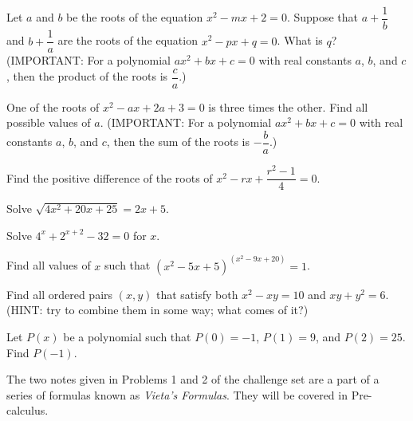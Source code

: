 \documentclass[../book.tex]{subfiles}
\begin{document}
\begin{challengeset}
\item Let $a$ and $b$ be the roots of the equation $x^2-mx+2=0$.  Suppose that $a+\dfrac{1}{b}$ and $b+\dfrac{1}{a}$ are the roots of the equation $x^2-px+q=0$.  What is $q$? (IMPORTANT: For a polynomial $ax^2+bx+c=0$ with real constants $a$, $b$, and $c$, then the product of the roots is $\dfrac{c}{a}$.) \vspace{2mm}
\item One of the roots of $x^2-ax+2a+3=0$ is three times the other.  Find all possible values of $a$.  (IMPORTANT: For a polynomial $ax^2+bx+c=0$ with real constants $a$, $b$, and $c$, then the sum of the roots is $-\dfrac{b}{a}$.) \vspace{2mm}
\item Find the positive difference of the roots of $x^2-rx+\dfrac{r^2-1}{4}=0$.  \vspace{3mm}
\item Solve $\sqrt{4x^2+20x+25}=2x+5$.  \vspace{2mm}
\item Solve $4^x+2^{x+2}-32=0$ for $x$.  \vspace{2mm}
\item Find all values of $x$ such that $\left(x^2-5x+5\right)^{(x^2-9x+20)}=1$.  \vspace{3mm}
\item Find all ordered pairs $(x,y)$ that satisfy both $x^2-xy=10$ and $xy+y^2=6$.  (HINT: try to combine them in some way; what comes of it?) \vspace{2mm}
\item Let $P(x)$ be a polynomial such that $P(0)=-1$, $P(1)=9$, and $P(2)=25$.  Find $P(-1)$.  \vspace{2mm}
\end{challengeset}
\begin{remark}
  The two notes given in Problems 1 and 2 of the challenge set are a part of a series of formulas known as \textit{Vieta's Formulas}.  They will be covered in Pre-calculus.
\end{remark}
\end{document}
